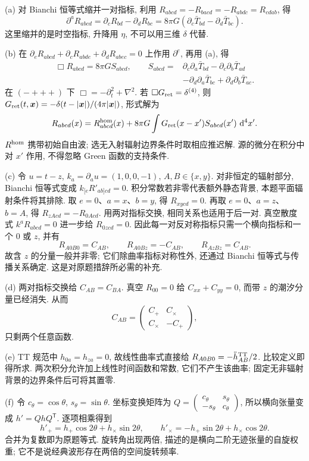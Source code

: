 \begin{solution}
(a) 对 Bianchi 恒等式缩并一对指标, 利用 $R_{abcd}=-R_{bacd}=-R_{abdc}=R_{cdab}$, 得
\[
\partial^aR_{abcd}=\partial_cR_{bd}-\partial_dR_{bc}
=8\pi G(\partial_c\bar T_{bd}-\partial_d\bar T_{bc}).
\]
这里缩并的是时空指标, 升降用 $\eta$, 不可以用三维 $\delta$ 代替.

(b) 在 $\partial_eR_{abcd}+\partial_cR_{abde}+\partial_dR_{abec}=0$ 上作用 $\partial^e$, 再用 (a), 得
\begin{align*}
\Box R_{abcd}=8\pi G S_{abcd},\qquad
S_{abcd}={}&\partial_c\partial_a\bar T_{bd}-\partial_c\partial_b\bar T_{ad}\\
&-\partial_d\partial_a\bar T_{bc}+\partial_d\partial_b\bar T_{ac}.
\end{align*}
在 $(-+++)$ 下 $\Box=-\partial_t^2+\nabla^2$. 若 $\Box G_{\rm ret}=\delta^{(4)}$, 则 $G_{\rm ret}(t,\boldsymbol x)=-\delta(t-|\boldsymbol x|)/(4\pi|\boldsymbol x|)$, 形式解为
\[
R_{abcd}(x)=R^{\rm hom}_{abcd}(x)+8\pi G\int G_{\rm ret}(x-x')S_{abcd}(x')\,\,\mathrm d^4x'.
\]
$R^{\rm hom}$ 携带初始自由波; 选无入射辐射边界条件时取相应推迟解. 源的微分在积分中对 $x'$ 作用, 不得忽略 Green 函数的支持条件.

(c) 令 $u=t-z$, $k_a=\partial_a u=(1,0,0,-1)$, $A,B\in\{x,y\}$. 对非恒定的辐射部分, Bianchi 恒等式变成 $k_{[e}R'_{ab]cd}=0$. 积分常数若非零代表额外静态背景, 本题平面辐射条件将其排除. 取 $e=0$、$a=x$、$b=y$, 得 $R_{xycd}=0$. 再取 $e=0$、$a=z$、$b=A$, 得 $R_{zAcd}=-R_{0Acd}$. 用两对指标交换, 相同关系也适用于后一对. 真空散度式 $k^aR_{abcd}=0$ 进一步给 $R_{0zcd}=0$. 因此每一对反对称指标只需一个横向指标和一个 $0$ 或 $z$, 并有
\[
R_{A0B0}=C_{AB},\qquad R_{A0Bz}=-C_{AB},\qquad R_{AzBz}=C_{AB}.
\]
故含 $z$ 的分量一般并非零; 它们除曲率指标对称性外, 还通过 Bianchi 恒等式与传播关系确定. 这是对原题措辞所必需的补充.

(d) 两对指标交换给 $C_{AB}=C_{BA}$. 真空 $R_{00}=0$ 给 $C_{xx}+C_{yy}=0$, 而带 $z$ 的潮汐分量已经消失. 从而
\[
C_{AB}=\begin{pmatrix}C_+&C_\times\\C_\times&-C_+\end{pmatrix},
\]
只剩两个任意函数.

(e) TT 规范中 $h_{0a}=h_{za}=0$, 故线性曲率式直接给 $R_{A0B0}=-\ddot h^{\rm TT}_{AB}/2$. 比较定义即得所求. 两次积分允许加上线性时间函数和常数, 它们不产生该曲率; 固定无非辐射背景的边界条件后可将其置零.

(f) 令 $c_\theta=\cos\theta$, $s_\theta=\sin\theta$. 坐标变换矩阵为 $Q=\left(\begin{smallmatrix}c_\theta&s_\theta\\-s_\theta&c_\theta\end{smallmatrix}\right)$, 所以横向张量变成 $h'=QhQ^{\mathsf T}$. 逐项相乘得到
\[
h'_+=h_+\cos2\theta+h_\times\sin2\theta,\qquad
h'_\times=-h_+\sin2\theta+h_\times\cos2\theta.
\]
合并为复数即为原题等式. 旋转角出现两倍, 描述的是横向二阶无迹张量的自旋权重; 它不是说经典波形存在两倍的空间旋转频率.
\end{solution}

